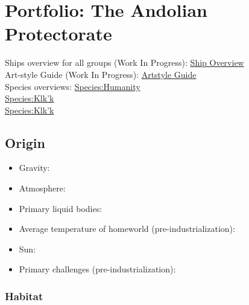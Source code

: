 \section{Portfolio: The Andolian Protectorate}
Ships overview for all groups (Work In Progress): \href{http://vegastrike.sourceforge.net/wiki/Artstyle\_guide:Overview\_Guide}{Ship Overview} \\
Art-style Guide (Work In Progress): \href{http://vegastrike.sourceforge.net/wiki/Artstyle\_guide:Andolian\_Protectorate}{Artstyle Guide} \\
Species overviews: \href{http://vegastrike.sourceforge.net/wiki/Species:Humanity}{Species:Humanity} \\
 \href{http://vegastrike.sourceforge.net/wiki/Species:Klk\'k}{Species:Klk'k} \\
 \href{http://vegastrike.sourceforge.net/wiki/Species:Purth}{Species:Klk'k} \\

\subsection{Origin}
\begin{itemize}
\item Gravity: 

\item Atmosphere: 

\item Primary liquid bodies: 

\item Average temperature of homeworld (pre-industrialization):

\item Sun: 

\item Primary challenges (pre-industrialization): 
\end{itemize}


\subsubsection{Habitat}

